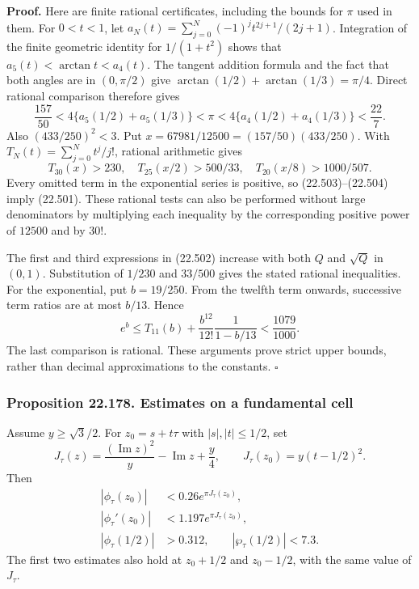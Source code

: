 \documentclass[
  11pt,
  a4paper,
]{article}
\begin{document}
\textbf{Proof.} Here are finite rational certificates, including the
bounds for \(\pi\) used in them. For \(0<t<1\), let
\(a_N(t)=\sum_{j=0}^N(-1)^jt^{2j+1}/(2j+1)\). Integration of the finite
geometric identity for \(1/(1+t^2)\) shows that
\(a_5(t)<\arctan t<a_4(t)\). The tangent addition formula and the fact
that both angles are in \((0,\pi/2)\) give
\(\arctan(1/2)+\arctan(1/3)=\pi/4\). Direct rational comparison
therefore gives \[
 \frac{157}{50}
 <4\{a_5(1/2)+a_5(1/3)\}<\pi
 <4\{a_4(1/2)+a_4(1/3)\}<\frac{22}{7}.
 \tag{22.503}
\] Also \((433/250)^2<3\). Put \(x=67981/12500
=(157/50)(433/250)\). With \(T_N(t)=\sum_{j=0}^Nt^j/j!\), rational
arithmetic gives \[
 T_{30}(x)>230,\quad
 T_{25}(x/2)>500/33,\quad
 T_{20}(x/8)>1000/507.
 \tag{22.504}
\] Every omitted term in the exponential series is positive, so
(22.503)--(22.504) imply (22.501). These rational tests can also be
performed without large denominators by multiplying each inequality by
the corresponding positive power of \(12500\) and by \(30!\).

The first and third expressions in (22.502) increase with both \(Q\) and
\(\sqrt Q\) in \((0,1)\). Substitution of \(1/230\) and \(33/500\) gives
the stated rational inequalities. For the exponential, put \(b=19/250\).
From the twelfth term onwards, successive term ratios are at most
\(b/13\). Hence \[
 e^b\le T_{11}(b)+\frac{b^{12}}{12!}\frac1{1-b/13}
 <\frac{1079}{1000}.
 \tag{22.505}
\] The last comparison is rational. These arguments prove strict upper
bounds, rather than decimal approximations to the constants. \(\square\)

\subsubsection{Proposition 22.178. Estimates on a fundamental
cell}\label{proposition-22.178.-estimates-on-a-fundamental-cell}

Assume \(y\ge\sqrt3/2\). For \(z_0=s+t\tau\) with \(|s|,|t|\le1/2\), set
\[
 J_\tau(z)=\frac{(\operatorname{Im}z)^2}{y}
             -\operatorname{Im}z+\frac y4,
 \qquad J_\tau(z_0)=y(t-1/2)^2.
 \tag{22.506}
\] Then \[
 \begin{split}
 |\phi_\tau(z_0)|&<0.26e^{\pi J_\tau(z_0)},\\
 |\phi_\tau'(z_0)|&<1.197e^{\pi J_\tau(z_0)},\\
 |\phi_\tau(1/2)|&>0.312,\qquad
 |\wp_\tau(1/2)|<7.3.
 \end{split}
 \tag{22.507}
\] The first two estimates also hold at \(z_0+1/2\) and \(z_0-1/2\),
with the same value of \(J_\tau\).
\end{document}

